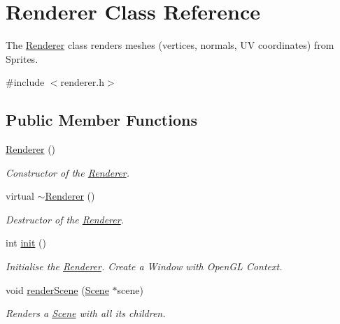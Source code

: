 \hypertarget{class_renderer}{}\section{Renderer Class Reference}
\label{class_renderer}


The \hyperlink{class_renderer}{Renderer} class renders meshes (vertices, normals, UV coordinates) from Sprites.  




{\ttfamily \#include $<$renderer.\+h$>$}

\subsection*{Public Member Functions}
\begin{DoxyCompactItemize}
\item 
\mbox{\label{class_renderer_a7ebf46f54dab9905f79b80f7fddb76a6}} 
\hyperlink{class_renderer_a7ebf46f54dab9905f79b80f7fddb76a6}{Renderer} ()
\begin{DoxyCompactList}\small\item\em Constructor of the \hyperlink{class_renderer}{Renderer}. \end{DoxyCompactList}\item 
\mbox{\label{class_renderer_afeee408862d5bd6255a6882d47e6d5cd}} 
virtual \hyperlink{class_renderer_afeee408862d5bd6255a6882d47e6d5cd}{$\sim$\+Renderer} ()
\begin{DoxyCompactList}\small\item\em Destructor of the \hyperlink{class_renderer}{Renderer}. \end{DoxyCompactList}\item 
int \hyperlink{class_renderer_a609f1ee6a2e5033035eb47636d0901ad}{init} ()
\begin{DoxyCompactList}\small\item\em Initialise the \hyperlink{class_renderer}{Renderer}. Create a Window with Open\+GL Context. \end{DoxyCompactList}\item 
void \hyperlink{class_renderer_a6dc601fc4faf3ab41bd212f6f31eaf89}{render\+Scene} (\hyperlink{class_scene}{Scene} $\ast$scene)
\begin{DoxyCompactList}\small\item\em Renders a \hyperlink{class_scene}{Scene} with all its children. \end{DoxyCompactList}\item 

\end{DoxyCompactItemize}
